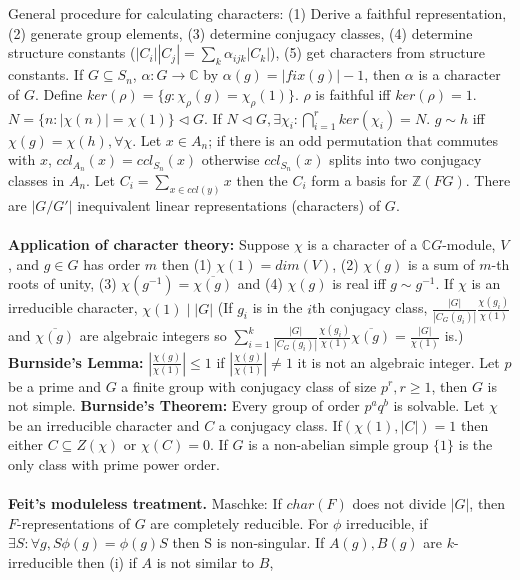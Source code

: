 General procedure for calculating characters: (1) Derive a faithful representation,
(2) generate group elements, (3) determine conjugacy classes, (4) determine structure
constants ($|C_i||C_j|= \sum_k \alpha_{ijk} |C_k|$), (5) get characters from structure
constants.
If $G \subseteq S_n$, $\alpha: G \rightarrow {\mathbb C}$ by $\alpha(g)= |fix(g)|-1$,
then $\alpha$ is a character of $G$. Define $ker(\rho)= \{g: \chi_{\rho}(g)= \chi_{\rho}(1) \}$.
$\rho$ is faithful iff $ker(\rho)=1$.  $N= \{n: |\chi(n)|= \chi(1) \} \lhd G$.  If
$N \lhd G, \exists \chi_i: \bigcap_{i=1}^r ker(\chi_i) =N$.  
$g \sim h$ iff $\chi(g)=\chi(h), \forall  \chi$.  
Let $x \in A_n$; if there is an odd permutation that commutes with $x$,
$ccl_{A_n}(x)=ccl_{S_n}(x)$ otherwise
$ccl_{S_n}(x)$ splits into two conjugacy classes in $A_n$.
Let $C_i= \sum_{x \in ccl(y)} x$ then the $C_i$ form a basis for ${\mathbb Z}(FG)$.
There are $|G/G'|$ inequivalent linear representations (characters) of $G$.
\\
\\
{\bf Application of character theory:}
Suppose $\chi$ is a character of a ${\mathbb C}G$-module, $V$, and $g \in G$ has order
$m$ then (1) $\chi(1)=dim(V)$, (2) $\chi(g)$ is a sum of $m$-th roots of unity,
(3) $\chi(g^{-1})= {\overline {\chi(g)}}$ and (4) $\chi(g)$ is real iff $g \sim g^{-1}$.
If $\chi$ is an irreducible character, $\chi(1) \mid |G|$ 
(If $g_i$ is in the $i$th conjugacy class,
${\frac {|G|} {|C_G(g_i)|}} {\frac {\chi(g_i)} {\chi(1)}}$ and ${\overline {\chi(g)}}$
are algebraic integers so
$\sum_{i=1}^k {\frac {|G|} {|C_G(g_i)|}} {\frac {\chi(g_i)} {\chi(1)}}{\overline {\chi(g)}}
={\frac {|G|} {\chi(1)}}$ is.) {\bf Burnside's Lemma:} 
$|{\frac {\chi(g)} {\chi(1)}}| \le 1$ if
$|{\frac {\chi(g)} {\chi(1)}}| \ne 1$ it is not an algebraic integer.  
Let $p$ be a prime and $G$ a finite
group with conjugacy class of size $p^r, r \ge 1$, then $G$ is not simple.
{\bf Burnside's Theorem:} Every group of order $p^a q^b$ is solvable.
Let $\chi$ be an irreducible character and $C$ a conjugacy class.
If$(\chi(1), |C|)=1$ then either $C \subseteq Z(\chi)$ or $\chi(C)=0$.  If $G$
is a non-abelian simple group $\{1\}$ is the only class with prime power
order.  
\\
\\
{\bf Feit's moduleless treatment.}
Maschke: If $char(F)$ does not divide $|G|$, then $F$-representations of $G$
are completely reducible.  For $\phi$ irreducible,
if $\exists S: \forall g, S \phi(g) = \phi(g) S$ then S is non-singular.
If $A(g), B(g)$ are $k$-irreducible then (i) if $A$ is not similar to $B$,
